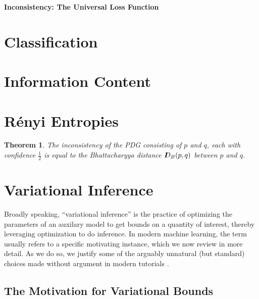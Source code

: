 \documentclass{article}
\theoremstyle{plain}
\newtheorem{theorem}{Theorem}[section]
\theoremstyle{definition}
\theoremstyle{remark}
\newcommand\mat[1]{\mathbf{#1}}
\newcommand{\thickD}{I\mkern-8muD}
\newcommand{\dg}[1]{\mathbdcal{#1}}
\DeclareMathOperator{\bundle}{\sqcup}
\newcommand\Inc{\mathit{Inc}}
\begin{document}
\begin{center}
	{\bfseries\Large Inconsistency: The Universal Loss Function}
\end{center}

\section{Classification}
\section{Information Content}
\section{R\'enyi Entropies}


\begin{theorem}\label{thm:bhattacharyya-dist}
	The inconsistency of the PDG consisting of $p$ and $q$, each with confidence $\frac12$ is equal to the Bhattacharyya distance $\thickD_B(p,q)$ between $p$ and $q$. 
\end{theorem}

\section{Variational Inference}
Broadly speaking, ``variational inference'' is the practice of optimizing the parameters of an auxilary model to get bounds on a quantity of interest, thereby leveraging optimization to do inference.  
In modern machine learning, the term usually refers to a specific motivating instance, which we now review in more detail. 
As we do so, we justify some of the arguably unnatural (but standard) choices made without argument in modern tutorials \cite{}.

\subsection{The Motivation for Variational Bounds}
	\label{sec:intro-to-variational-inference}
\def\xsamp{{\underline{\mat X}}}
\end{document}

